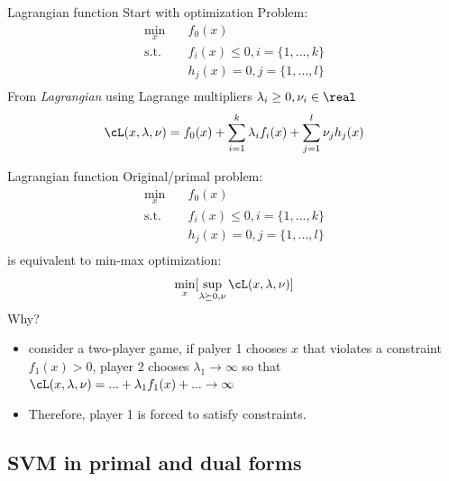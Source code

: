 \documentclass[notes]{beamer}
\begin{document}
\begin{frame}{Lagrangian function} 
	Start with optimization Problem: 
	\begin{equation}
		\begin{aligned}
			\min_x \quad & f_0(x)  \\ 
			\textrm{s.t.} \quad & f_i(x) \le 0, i = \{1,...,k\} \\  
					 \quad & h_j(x) = 0, j = \{1,...,l\} \\ 
		\end{aligned}
	\end{equation}
	From \emph{Lagrangian} using Lagrange multipliers $\lambda_i \ge 0, \nu_i \in \real$ 
	\begin{equation}
		\cL(x,\lambda,\nu) = f_0(x)+\sum_{i=1}^{k} \lambda_i f_i(x) + \sum_{j=1}^{l} \nu_j h_j (x) 
	\end{equation}
\end{frame}

\begin{frame}
	{Lagrangian function}
	Original/primal problem: 
	\begin{equation*}
		\begin{aligned}
			\min_x \quad & f_0(x)  \\ 
			\textrm{s.t.} \quad & f_i(x) \le 0, i = \{1,...,k\} \\  
					 \quad & h_j(x) = 0, j = \{1,...,l\} \\ 
		\end{aligned}
	\end{equation*}
	is equivalent to min-max optimization: 
	\[\min_x [\sup_{\lambda \succeq 0, \nu} \cL(x,\lambda, \nu)] \] 
	Why? 
	\pause
	\begin{itemize}
		\item consider a two-player game, if palyer 1 chooses $x$ that violates a constraint $f_1(x)>0$, player 2 chooses $\lambda_1 \rightarrow \infty$ so that $\cL (x,\lambda,\nu)=...+\lambda_1 f_1(x)+... \rightarrow \infty $
		\item Therefore, player 1 is forced to satisfy constraints. 
	\end{itemize}
\end{frame}

\subsection{SVM in primal and dual forms}
\end{document}
